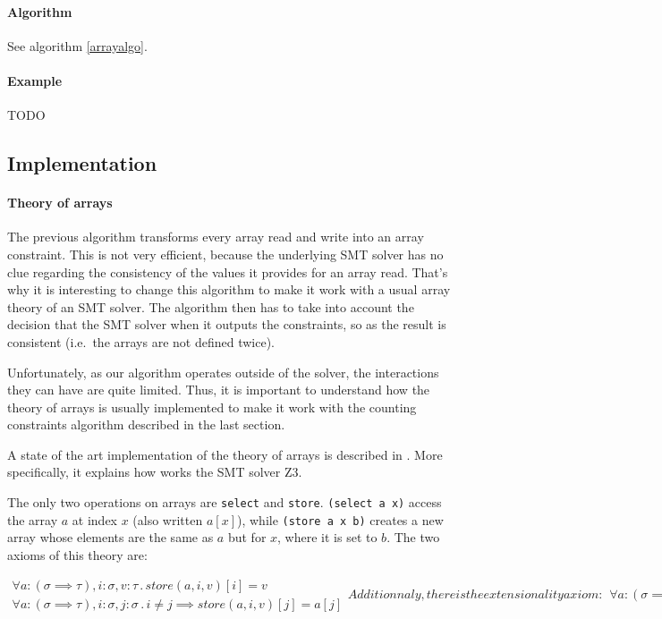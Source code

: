 {\paragraph{Algorithm}\label{algorithm-1}

See algorithm \ref{arrayalgo}.

\paragraph{Example}\label{example-1}

TODO
}

\subsection{Implementation}

\paragraph{Theory of arrays} The previous algorithm transforms every array read and write into an
array constraint. This is not very efficient, because the underlying SMT
solver has no clue regarding the consistency of the values it provides
for an array read. That's why it is interesting to change this algorithm
to make it work with a usual array theory of an SMT solver. The
algorithm then has to take into account the decision that the SMT solver
when it outputs the constraints, so as the result is consistent
(i.e.~the arrays are not defined twice).

Unfortunately, as our algorithm operates outside of the solver, the
interactions they can have are quite limited. Thus, it is important to
understand how the theory of arrays is usually implemented to make it
work with the counting constraints algorithm described in the last
section.

A state of the art implementation of the theory of arrays is described
in \cite{de2009generalized}. More specifically, it
explains how works the SMT solver Z3.

The only two operations on arrays are \texttt{select} and
\texttt{store}. \texttt{(select\ a\ x)} access the array $a$ at index
$x$ (also written $a[x]$), while \texttt{(store\ a\ x\ b)} creates a
new array whose elements are the same as $a$ but for $x$, where it
is set to $b$. The two axioms of this theory are:

\begin{subequations}
    \begin{align}
        \forall a:(\sigma \implies \tau), i:\sigma, v:\tau\, .\, store(a, i, v)[i] = v
        \\
        \forall a:(\sigma \implies \tau), i:\sigma, j:\sigma\, .\, i \neq j \implies store(a, i, v)[j] = a[j]
    \end{align}


    Additionnaly, there is the extensionality axiom:

    \begin{align}
        \forall a:(\sigma \implies \tau), b:(\sigma \implies \tau)\, .\, a \neq b \iff \exists i\: a[i] \implies a[i] \neq b[i]
    \end{align}
\end{subequations}

